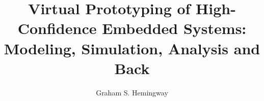 \documentclass[12pt]{report}
\begin{document}
	\title{Virtual Prototyping of High-Confidence Embedded Systems: Modeling, Simulation, Analysis and Back}
	\author{Graham S. Hemingway}
	




\end{document}
